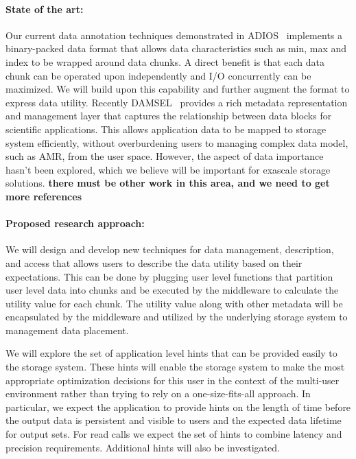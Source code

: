 \paragraph{State of the art:}
Our current data annotation techniques demonstrated in
ADIOS~\cite{lofstead:2009:ipdps} implements a binary-packed data format that
allows data characteristics such as min, max and index to be wrapped around
data chunks. A direct benefit is that each data chunk can be operated upon
independently and I/O concurrently can be maximized. We will build upon this
capability and further augment the format to express data utility.  Recently
DAMSEL~\cite{damsel} provides a rich metadata representation and management
layer that captures the relationship between data blocks for scientific
applications.  This allows application data to be mapped to storage system
efficiently, without overburdening users to managing complex data model, such
as AMR, from the user space. However, the aspect of data importance hasn't been
explored, which we believe will be important for exascale storage solutions.
{\color{red}\bf there must be other work in this area, and we need to get more
references}

\paragraph{Proposed research approach:} 
We will design and develop new techniques for data management, description,
and access that allows users to describe the data utility based on their
expectations. This can be done by plugging user level functions that
partition user level data into chunks and be executed by the middleware to
calculate the utility value for each chunk. The utility value along with other
metadata will be encapsulated by the middleware and utilized by the underlying
storage system to management data placement.
%

We will explore the set of application level hints that can be provided easily
to the storage system. These hints will enable the storage system to make the
most appropriate optimization decisions for this user in the context of the
multi-user environment rather than trying to rely on a one-size-fits-all
approach. In particular, we expect the application to provide hints on the
length of time before the output data is persistent and visible to users and
the expected data lifetime for output sets.  For read calls we expect the set
of hints to combine latency and precision requirements.  Additional hints will
also be investigated. 

